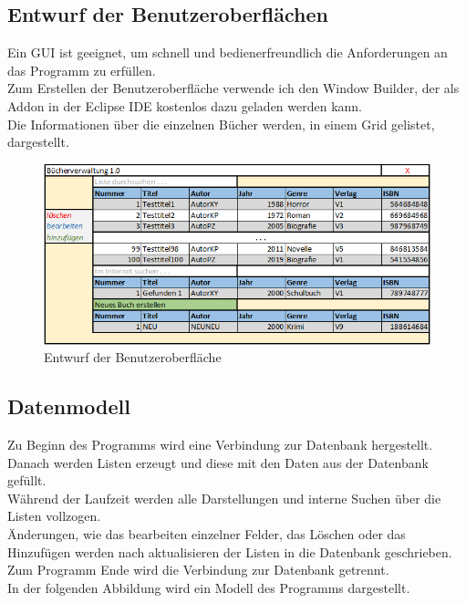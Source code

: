 \subsection{Entwurf der Benutzeroberflächen}
Ein GUI ist geeignet, um schnell und bedienerfreundlich die Anforderungen an das Programm zu erfüllen.\\
Zum Erstellen der Benutzeroberfläche verwende ich den Window Builder, der als Addon in der Eclipse IDE kostenlos dazu geladen werden kann.\\
Die Informationen über die einzelnen Bücher werden, in einem Grid gelistet, dargestellt.\\
\begin{figure}[h]
\begin{center}
\includegraphics[width=15cm]{img/entwurf.png}
\caption{Entwurf der Benutzeroberfläche}
\label{entwurf_gui}
\end{center}
\end{figure}


\subsection{Datenmodell}
Zu Beginn des Programms wird eine Verbindung zur Datenbank hergestellt.\\
Danach werden Listen erzeugt und diese mit den Daten aus der Datenbank gefüllt.\\
Während der Laufzeit werden alle Darstellungen und interne Suchen über die Listen vollzogen.\\
Änderungen, wie das bearbeiten einzelner Felder, das Löschen oder das Hinzufügen werden nach aktualisieren der Listen in die Datenbank geschrieben.\\
Zum Programm Ende wird die Verbindung zur Datenbank getrennt.\\
In der folgenden Abbildung wird ein Modell des Programms dargestellt.\\

